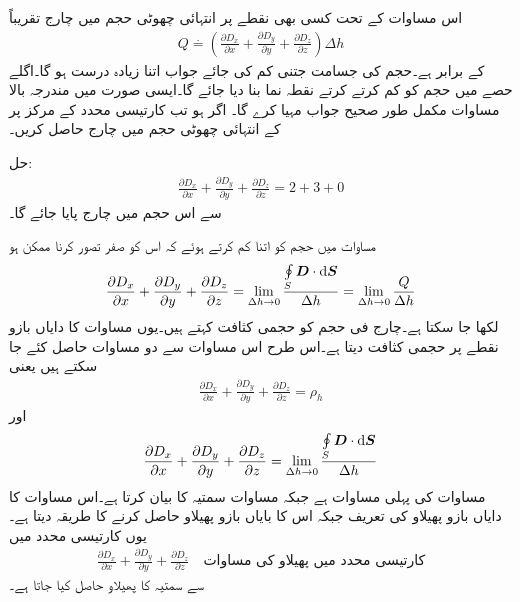اس مساوات کے تحت کسی بھی نقطے پر انتہائی چھوٹی حجم  میں چارج تقریباً
\begin{align}
Q\overset{.}{=} \left( \frac{\partial D_x}{\partial x}+\frac{\partial D_y}{\partial y}+\frac{\partial D_z}{\partial z} \right)\Delta h
\end{align}
کے برابر ہے۔حجم کی جسامت جتنی کم کی جائے جواب اتنا زیادہ درست ہو گا۔اگلے حصے میں حجم کو کم کرتے کرتے نقطہ نما بنا دیا جائے گا۔ایسی صورت میں مندرجہ بالا مساوات مکمل طور صحیح جواب مہیا کرے گا۔
اگر  ہو تب کارتیسی محدد کے مرکز پر  کے انتہائی چھوٹی حجم میں چارج حاصل کریں۔

حل:
\begin{align*}
\frac{\partial D_x}{\partial x}+\frac{\partial D_y}{\partial y}+\frac{\partial D_z}{\partial z} =2+3+0
\end{align*}
سے اس حجم میں  چارج  پایا جائے گا۔

مساوات  میں حجم  کو اتنا کم کرتے ہوئے کہ اس کو صفر تصور کرنا ممکن ہو
\begin{align*}
\frac{\partial D_x}{\partial x}+\frac{\partial D_y}{\partial y}+\frac{\partial D_z}{\partial z}=\lim_{\Delta h \to 0}\frac{\oint\limits_{S}\kvec{D}\cdot \dif \kvec{S}}{\Delta h}=\lim_{\Delta h \to 0} \frac{Q}{\Delta h}
\end{align*}
لکھا جا سکتا ہے۔چارج فی حجم کو حجمی کثافت کہتے ہیں۔یوں مساوات کا دایاں بازو نقطے پر حجمی کثافت  دیتا ہے۔اس طرح اس مساوات سے دو مساوات حاصل کئے جا سکتے ہیں یعنی
\begin{align}\label{مساوات_گاؤس_میکسویل_پھیلاو_مساوات}
\frac{\partial D_x}{\partial x}+\frac{\partial D_y}{\partial y}+\frac{\partial D_z}{\partial z}=\rho_h
\end{align}
اور 
\begin{align}\label{مساوات_گاؤس_پھیلاو_کی_تعریف}
\frac{\partial D_x}{\partial x}+\frac{\partial D_y}{\partial y}+\frac{\partial D_z}{\partial z}=\lim_{\Delta h \to 0}\frac{\oint\limits_{S}\kvec{D}\cdot \dif \kvec{S}}{\Delta h}
\end{align}
مساوات   کی پہلی مساوات ہے جبکہ مساوات  سمتیہ  کا  بیان کرتا ہے۔اس مساوات کا دایاں بازو پھیلاو کی تعریف جبکہ اس کا بایاں بازو پھیلاو حاصل کرنے کا طریقہ دیتا ہے۔یوں کارتیسی محدد میں 
\begin{align}\label{مساوات_گاؤس_کارتیسی_محدد_پھیلاو_کی_مساوات}
\frac{\partial D_x}{\partial x}+\frac{\partial D_y}{\partial y}+\frac{\partial D_z}{\partial z} \quad \textrm{کارتیسی محدد میں پھیلاو کی مساوات}
\end{align}
سے سمتیہ  کا پھیلاو حاصل کیا جاتا ہے۔

